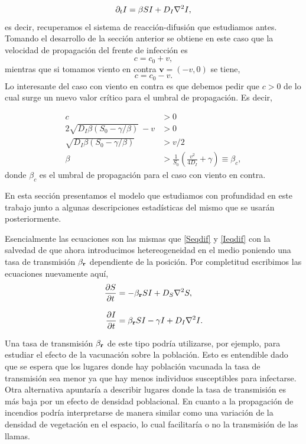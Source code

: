 \begin{equation}
  \partial_t I = \beta SI + D_I \laplacian{I},
\end{equation}
es decir, recuperamos el sistema de reacción-difusión que estudiamos antes. Tomando el desarrollo de la sección anterior se obtiene en este caso que la velocidad de propagación 
del frente de infección es 
$$c = c_0 + v,$$
mientras que si tomamos viento en contra $\mathbf{v} = (-v,0)$ se tiene,
$$c = c_0 - v.$$
Lo interesante del caso con viento en contra es que debemos pedir que $c>0$ de lo cual surge un nuevo valor crítico para el umbral de propagación. Es decir,

\begin{align*}
  c &> 0 \\
  2\sqrt{D_I\beta(S_0-\gamma/\beta)}\ - v &> 0 \\
  \sqrt{D_I\beta(S_0-\gamma/\beta)} &> v/2 \\
  \beta &> \frac{1}{S_0}(\frac{v^2}{4D_I}+\gamma) \equiv \beta_c, 
\end{align*}
donde $\beta_c$ es el umbral de propagación para el caso con viento en contra.





En esta sección presentamos el modelo que estudiamos con profundidad en este trabajo junto a algunas descripciones estadísticas del mismo que se usarán 
posteriormente. 

Esencialmente las ecuaciones son las mismas que \ref{Seqdif} y \ref{Ieqdif} con la salvedad de que ahora introducimos hetereogeneidad en el medio poniendo 
una tasa de transmisión $\beta_{\vb{r}}$ dependiente de la posición. Por completitud escribimos las ecuaciones nuevamente aquí,
\begin{align}
  \pdv{S}{t}&=-\beta_{\vb{r}} SI + D_{S} \laplacian{S}  ,\label{Seqfinal}\\[.3cm]
  \pdv{I}{t}&=\beta_{\vb{r}} SI - \gamma I + D_{I} \laplacian{I}.\label{Ieqfinal}
\end{align}

Una tasa de transmisión $\beta_{\vb{r}}$ de este tipo podría utilizarse, por ejemplo, para estudiar el efecto de la vacunación sobre la población. Esto es 
entendible dado que se espera que los lugares donde hay población vacunada la tasa de transmisión sea menor ya que hay menos individuos susceptibles para
infectarse. Otra alternativa apuntaría a describir lugares donde la tasa de transmisión es más baja por un efecto de densidad poblacional. 
En cuanto a la propagación de incendios podría interpretarse de manera similar como una variación de la densidad de vegetación en el espacio, lo cual 
facilitaría o no la transmisión de las llamas.

